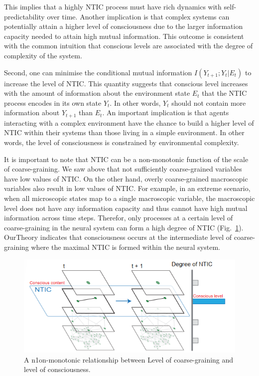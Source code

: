 \documentclass[utf8]{article}
\begin{document}
            This implies that a highly NTIC process must have rich dynamics with self-predictability over time. Another implication is that complex systems can potentially attain a higher level of consciousness due to the larger information capacity needed to attain high mutual information. This outcome is consistent with the common intuition that conscious levels are associated with the degree of complexity of the system.
    
    	    Second, one can minimise the conditional mutual information $I(Y_{t+1};Y_{t}|E_{t})$ to increase the level of NTIC. This quantity suggests that conscious level increases with the amount of information about the environment state $E_t$ that the NTIC process encodes in its own state $Y_t$. In other words, $Y_t$ should not contain more information about $Y_{t+1}$ than $E_t$. An important implication is that agents interacting with a complex environment have the chance to build a higher level of NTIC within their systems than those living in a simple environment. In other words, the level of consciousness is constrained by environmental complexity. 
    	   
    		It is important to note that NTIC can be a non-monotonic function of the scale of coarse-graining. We saw above that not sufficiently coarse-grained variables have low values of NTIC. On the other hand, overly coarse-grained macroscopic variables  also result in low values of NTIC. For example, in an extreme scenario, when all microscopic states map to a single macroscopic variable, the macroscopic level does not have any information capacity and thus cannot have high mutual information across time steps.  Therefor, only processes at a certain level of coarse-graining in the neural system can form a high degree of NTIC (Fig.~\ref{fig:LevelOfConsciousness}). \ac{OurTheory} indicates that consciousness occurs at the intermediate level of coarse-graining where the maximal NTIC is formed within the neural system. 
    		
    		\begin{figure}[H]				
        		\includegraphics[width=\textwidth]{WritingMaterials/Fig_temp/FoxitReader_2019-01-31_19-03-59.png}
        		\caption{A n1on-monotonic relationship between Level of coarse-graining and level of consciousness.}
        		\label{fig:LevelOfConsciousness}
    		\end{figure}
            
\end{document}
